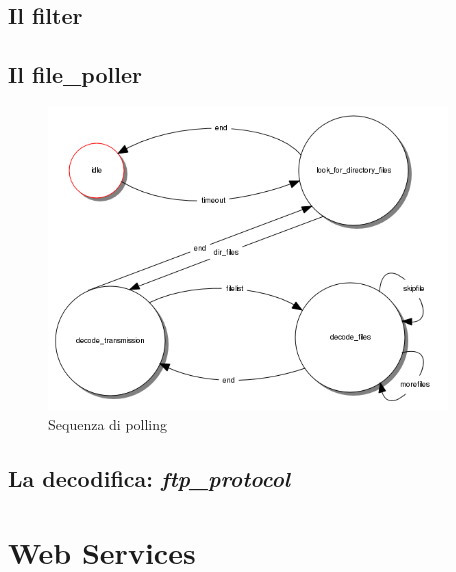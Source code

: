 \subsection{Il filter}
\subsection{Il file\_poller}
%
\begin{figure}[!h]
\centering
\includegraphics[width=300pt]{img/file-poller.png}
\caption{Sequenza di polling}
\end{figure}
%
\subsection{La decodifica: \emph{ftp\_protocol}}

\section{Web Services}
